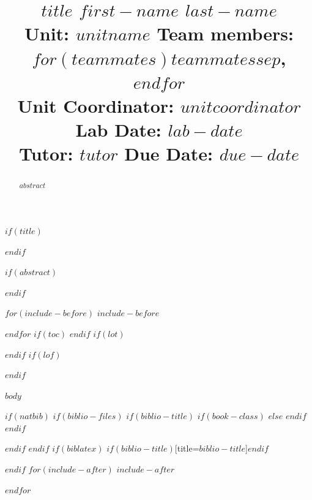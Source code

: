 \documentclass[$if(fontsize)$$fontsize$,$endif$$if(lang)$$lang$,$endif$$if(papersize)$$papersize$,$endif$$for(classoption)$$classoption$$sep$,$endfor$]{$documentclass$}
\title{
\noindent
\large\textbf{$title$} \hfill \textbf{$first-name$ $last-name$} \\
\normalsize Unit: $unitname$ \hfill Team members: $for(teammates)$$teammates$$sep$, $endfor$ \\
Unit Coordinator: $unitcoordinator$ \hfill Lab Date: $lab-date$ \\
Tutor: $tutor$ \hfill Due Date: $due-date$
}
\date{\vspace{-5ex}}
\begin{document}
$if(title)$
\maketitle
$endif$

$if(abstract)$
\begin{abstract}
$abstract$
\end{abstract}
$endif$

$for(include-before)$
$include-before$

$endfor$
$if(toc)$
{
\hypersetup{linkcolor=black}
\setcounter{tocdepth}{$toc-depth$}
\tableofcontents
}
$endif$
$if(lot)$
\listoftables
$endif$
$if(lof)$
\listoffigures
$endif$



$body$

$if(natbib)$
$if(biblio-files)$
$if(biblio-title)$
$if(book-class)$
\renewcommand\bibname{$biblio-title$}
$else$
\renewcommand\refname{$biblio-title$}
$endif$
$endif$


$endif$
$endif$
$if(biblatex)$
\printbibliography$if(biblio-title)$[title=$biblio-title$]$endif$

$endif$
$for(include-after)$
$include-after$

$endfor$
\end{document}

